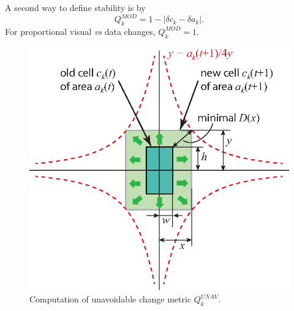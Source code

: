 \noindent A second way to define stability is by
%
\begin{equation}
Q^{MOD}_k = 1 - | \delta c_k - \delta a_k |.
\end{equation}
%
For proportional visual \emph{vs} data changes, $Q^{MOD}_k=1$.

\begin{figure}[htbp!]
\centering
\includegraphics[width=.7\textwidth]{figures/initial-treemap-evaluation/unavoidable.eps}
\vspace{-0.1cm}
\caption{Computation of unavoidable change metric $Q^{UNAV}_k$.}
\vspace{-0.2cm}
\label{fig:unavoidable}
\end{figure}



